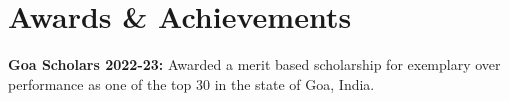 \documentclass[12pt]{article}
\makeatletter
\newcommand{\resumeOrganizationHeading}[4]{
  \vspace{-2pt}\item
    \begin{tabular*}{0.97\textwidth}[t]{l@{\extracolsep{\fill}}r}
      \textbf{#1} & \textit{\small #2} \\
      \textit{\small#3}
    \end{tabular*}\vspace{-7pt}
}
\newcommand{\resumeSubHeadingListStart}{\begin{itemize}[leftmargin=0.15in, label={}]}
\newcommand{\resumeSubHeadingListEnd}{\end{itemize}}
\makeatother
\begin{document}
\section{Awards \& Achievements}
  \resumeSubHeadingListStart
    \small{\item{
        \textbf{Goa Scholars 2022-23:}{ Awarded a merit based scholarship for exemplary over performance as one of the top 30 in the state of Goa, India.} \\ 
        }}
  \resumeSubHeadingListEnd




    
    




    
    








    



\end{document}
